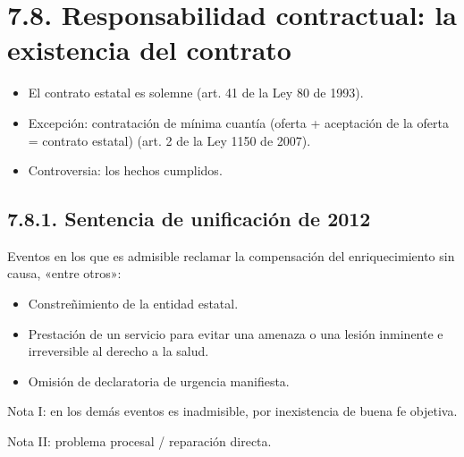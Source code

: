 \section{7.8. Responsabilidad contractual: la existencia del contrato}
\begin{itemize}
\item El contrato estatal es solemne (art. 41 de la Ley 80 de 1993).
\item Excepción: contratación de mínima cuantía (oferta + aceptación de la oferta = contrato estatal) (art. 2 de la Ley 1150 de 2007).
\item Controversia: los hechos cumplidos.
\end{itemize}
\subsection{7.8.1. Sentencia de unificación de 2012}
Eventos en los que es admisible reclamar la compensación del enriquecimiento sin causa, «entre otros»:

\begin{itemize}
\item Constreñimiento de la entidad estatal.
\item Prestación de un servicio para evitar una amenaza o una lesión inminente e irreversible al derecho a la salud.
\item Omisión de declaratoria de urgencia manifiesta.
\end{itemize}
Nota I: en los demás eventos es inadmisible, por inexistencia de buena fe objetiva.

Nota II: problema procesal / reparación directa.

